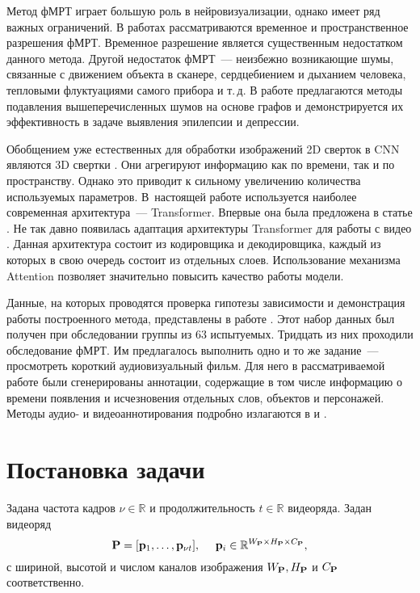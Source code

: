 \documentclass[a4paper, 12pt]{article}
\begin{document}
	Метод фМРТ играет большую роль в нейровизуализации, однако имеет ряд важных ограничений.
	В работах \citep{menon1999spatial, logothetis2008we} рассматриваются 
	временное и пространственное разрешения фМРТ. Временное разрешение является существенным
	недостатком данного метода. Другой недостаток фМРТ~--- неизбежно возникающие шумы, 
	связанные с движением объекта в сканере, сердцебиением и дыханием человека, тепловыми
	флуктуациями самого прибора и т.\,д. В работе \citep{1804.10167} предлагаются методы 
	подавления вышеперечисленных шумов на основе графов и демонстрируется их эффективность в задаче
	выявления эпилепсии и депрессии.

	Обобщением уже естественных для обработки изображений 2D сверток в CNN являются 3D
	свертки \citep{Tran_2015_ICCV}.
	Они агрегируют информацию как по времени, так и по пространству.
	Однако это приводит к сильному увеличению количества используемых параметров.
	В~настоящей работе используется наиболее современная архитектура~--- Transformer.
	Впервые она была предложена в статье \citep{https://doi.org/10.48550/arxiv.1706.03762}.
	Не так давно появилась адаптация архитектуры Transformer для работы с видео
	\citep{https://doi.org/10.48550/arxiv.2201.04288}. Данная архитектура состоит из кодировщика
	и декодировщика, каждый из которых в свою очередь состоит из отдельных слоев. Использование 
	механизма Attention \citep{https://doi.org/10.48550/arxiv.1706.03762} 
	позволяет значительно повысить качество работы модели.

	Данные, на которых проводятся проверка гипотезы зависимости и демонстрация работы построенного 
	метода, представлены в работе \citep{Berezutskaya2022}. Этот набор данных был получен при
	обследовании группы из 63 испытуемых. Тридцать из них проходили обследование фМРТ.
	Им предлагалось выполнить одно и то же задание~--- просмотреть короткий аудиовизуальный фильм. 
	Для него в рассматриваемой работе были сгенерированы аннотации, содержащие в том числе информацию о времени появления и исчезновения
	отдельных слов, объектов и персонажей. Методы аудио- и видеоаннотирования подробно излагаются в
	\citep{boersma2018praat} и \citep{Berezutskaya2020}. 

\section{Постановка задачи}

	Задана частота кадров $\nu \in \mathbb{R}$ и продолжительность $t \in \mathbb{R}$ видеоряда. 
	Задан видеоряд
	\begin{equation}
		\label{eq1}
		\mathbf{P} = [\mathbf{p}_1, \ldots, \mathbf{p}_{\nu t}], \quad\
		\mathbf{p}_i \in \mathbb{R}^{W_{\mathbf{P}} \times H_{\mathbf{P}} \times C_{\mathbf{P}}},
	\end{equation}
	с шириной, высотой и числом каналов изображения $W_{\mathbf{P}}, H_{\mathbf{P}}$ и 
	$C_{\mathbf{P}}$ соответственно.
\end{document}
